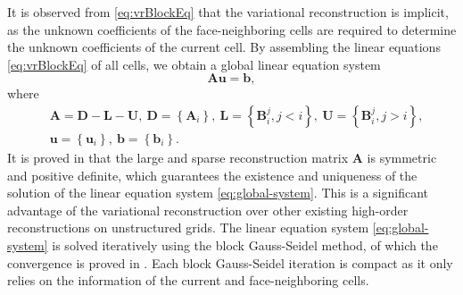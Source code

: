 It is observed from \eqref{eq:vrBlockEq} that the variational reconstruction is implicit, as the unknown coefficients of the face-neighboring cells are required to determine the unknown coefficients of the current cell. 
By assembling the linear equations \eqref{eq:vrBlockEq} of all cells, we obtain a global linear equation system
\begin{equation}
	\label{eq:global-system}
	\mathbf{A} \mathbf{u} = \mathbf{b},
\end{equation}
where 
\begin{equation}
	\begin{aligned}
		&\mathbf{A}= \mathbf{D} -  \mathbf{L} -  \mathbf{U}, 
		\ \mathbf{D}= \left\{\mathbf{A}_i\right\}, 
		\ \mathbf{L}= \left\{\mathbf{B}^j_i, j<i\right\},
		\ \mathbf{U}= \left\{\mathbf{B}^j_i, j>i\right\},
		\\
		& \mathbf{u}= \left\{\mathbf{u}_i\right\}, \ \mathbf{b}= \left\{\mathbf{b}_i\right\}.
	\end{aligned}
\end{equation}
It is proved in \cite{wang2017compact_VR} that the large and sparse reconstruction matrix $\mathbf{A}$ is symmetric and positive definite, which guarantees the existence and uniqueness of the solution of the linear equation system \eqref{eq:global-system}. This is a significant advantage of the variational reconstruction over other existing high-order reconstructions on unstructured grids.
The linear equation system \eqref{eq:global-system} is solved iteratively using the block Gauss-Seidel method, of which the convergence is proved in \cite{wang2017compact_VR}.
Each block Gauss-Seidel iteration is compact as it only relies on the information of the current and face-neighboring cells.

